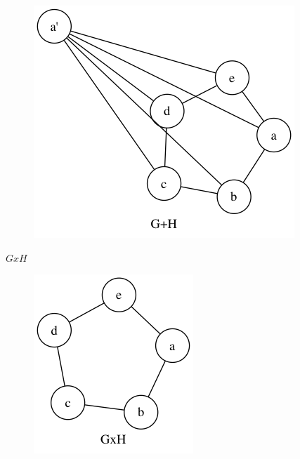 \begin{enumerate}[(a)]
\begin{figure}[H]
    \includegraphics[scale=0.5]{115/115cGH.png}
    \end{figure}
    $GxH$
    \begin{figure}[H]
    \centering
    \includegraphics[scale=0.5]{115/115cGH2.png}
    \end{figure}
\end{enumerate}
